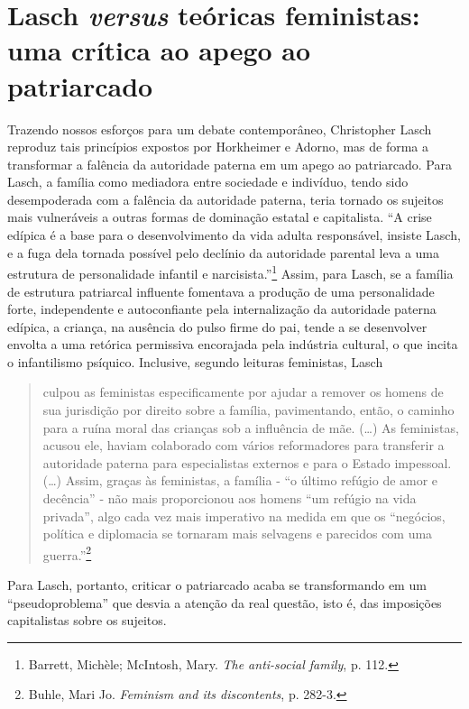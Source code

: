 \section{Lasch \emph{versus} teóricas feministas: uma crítica ao apego ao
patriarcado}

Trazendo nossos esforços para um debate contemporâneo, Christopher Lasch
reproduz tais princípios expostos por Horkheimer e Adorno, mas de forma
a transformar a falência da autoridade paterna em um apego ao
patriarcado. Para Lasch, a família como mediadora entre sociedade e
indivíduo, tendo sido desempoderada com a falência da autoridade
paterna, teria tornado os sujeitos mais vulneráveis a outras formas de
dominação estatal e capitalista. ``A crise edípica é a base para o
desenvolvimento da vida adulta responsável, insiste Lasch, e a fuga dela
tornada possível pelo declínio da autoridade parental leva a uma
estrutura de personalidade infantil e narcisista.''\footnote{Barrett,
  Michèle; McIntosh, Mary. \emph{The anti-social family}, p. 112.}
Assim, para Lasch, se a família de estrutura patriarcal influente
fomentava a produção de uma personalidade forte, independente e
autoconfiante pela internalização da autoridade paterna edípica, a
criança, na ausência do pulso firme do pai, tende a se desenvolver
envolta a uma retórica permissiva encorajada pela indústria cultural, o
que incita o infantilismo psíquico. Inclusive, segundo leituras
feministas, Lasch

\begin{quote}
culpou as feministas especificamente por ajudar a remover os homens de
sua jurisdição por direito sobre a família, pavimentando, então, o
caminho para a ruína moral das crianças sob a influência de mãe. (\ldots{})
As feministas, acusou ele, haviam colaborado com vários reformadores
para transferir a autoridade paterna para especialistas externos e para
o Estado impessoal. (\ldots{}) Assim, graças às feministas, a família -
``o último refúgio de amor e decência'' - não mais proporcionou aos
homens ``um refúgio na vida privada'', algo cada vez mais imperativo na
medida em que os ``negócios, política e diplomacia se tornaram mais
selvagens e parecidos com uma guerra.''\footnote{Buhle, Mari Jo.
  \emph{Feminism and its discontents}, p. 282-3.}
\end{quote}

Para Lasch, portanto, criticar o patriarcado acaba se transformando em
um ``pseudoproblema'' que desvia a atenção da real questão, isto é, das
imposições capitalistas sobre os sujeitos.

